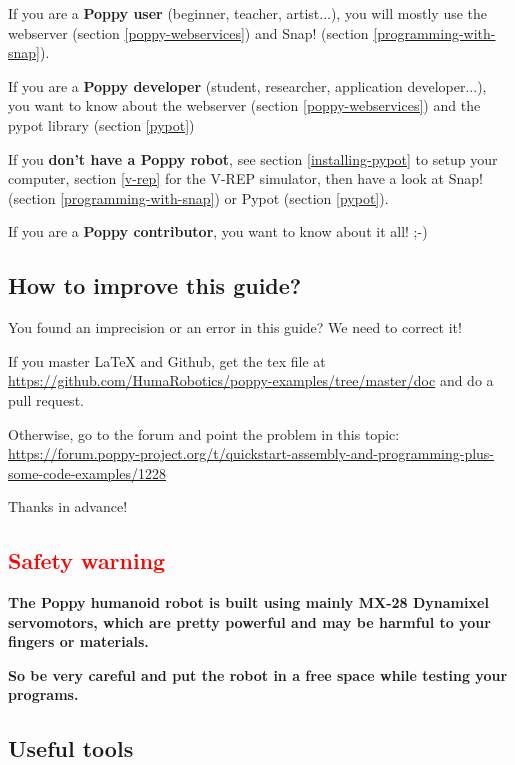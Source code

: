 \documentclass{article}
\begin{document}
If you are a \textbf{Poppy user} (beginner, teacher, artist...), you will mostly use the webserver (section \ref{poppy-webservices}) and Snap! (section \ref{programming-with-snap}).

If you are a \textbf{Poppy developer} (student, researcher, application developer...), you want to know about the webserver (section \ref{poppy-webservices}) and the pypot library (section \ref{pypot})

If you \textbf{don't have a Poppy robot}, see section \ref{installing-pypot} to setup your computer, section \ref{v-rep} for the V-REP simulator, then have a look at Snap! (section \ref{programming-with-snap}) or Pypot (section \ref{pypot}).

If you are a \textbf{Poppy contributor}, you want to know about it all! ;-)


\subsection{How to improve this guide?}

You found an imprecision or an error in this guide? We need to correct it!

If you master LaTeX and Github, get the tex file at \href{https://github.com/HumaRobotics/poppy-examples/tree/master/doc}{https://github.com/HumaRobotics/poppy-examples/tree/master/doc} and do a pull request.

Otherwise, go to the forum and point the problem in this topic: \href{https://forum.poppy-project.org/t/quickstart-assembly-and-programming-plus-some-code-examples/1228}{https://forum.poppy-project.org/t/quickstart-assembly-and-programming-plus-some-code-examples/1228}

Thanks in advance!

\subsection{\textcolor{red}{Safety warning}}

\textbf{The Poppy humanoid robot is built using mainly MX-28 Dynamixel servomotors, which are pretty powerful and may be harmful to your fingers or materials.}

\textbf{So be very careful and put the robot in a free space while testing your programs.}

\subsection{Useful tools}
\end{document}
